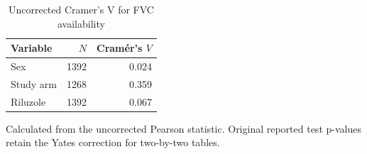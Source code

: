 \begin{table}[ht!]
\centering
\small
\caption[Uncorrected Cramer's V for FVC availability]{Uncorrected Cramer's V for FVC availability}
\label{tab:review_s1_cramers_v}
\setlength{\tabcolsep}{4pt}
\begin{tabular}{lrr}
\toprule
Variable & $N$ & Cram\'er's $V$ \\
\midrule
Sex & 1392 & 0.024 \\
Study arm & 1268 & 0.359 \\
Riluzole & 1392 & 0.067 \\
\bottomrule
\end{tabular}
\par\smallskip
\begin{minipage}{0.98\linewidth}\footnotesize
Calculated from the uncorrected Pearson statistic. Original reported test p-values retain the Yates correction for two-by-two tables.
\end{minipage}
\end{table}
